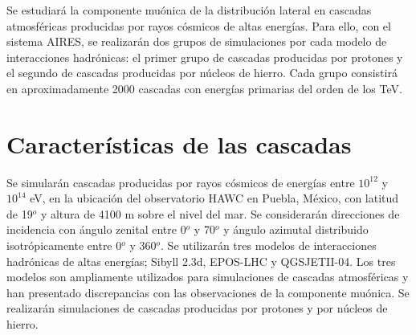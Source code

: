 
Se estudiar\'a la componente mu\'onica de la distribuci\'on lateral en cascadas atmosf\'ericas producidas por rayos c\'osmicos de altas energ\'ias. Para ello, con el sistema AIRES, se realizar\'an dos grupos de simulaciones por cada modelo de interacciones hadr\'onicas: el primer grupo de cascadas producidas por protones y el segundo de cascadas producidas por n\'ucleos de hierro. Cada grupo consistir\'a en aproximadamente 2000 cascadas con energ\'ias primarias del orden de los TeV.

\section{Características de las cascadas}
Se simular\'an cascadas producidas por rayos cósmicos de energías entre $10^{12}$ y $10^{14}$ eV, en la ubicaci\'on del observatorio HAWC en Puebla, M\'exico, con latitud de 19$^{o}$ y altura de 4100 m sobre el nivel del mar. Se considerar\'an direcciones de incidencia con ángulo zenital  entre 0$^{o}$ y 70$^{o}$ y ángulo azimutal distribuido isotrópicamente entre 0$^{o}$ y 360$^{o}$. Se utilizar\'an tres modelos de interacciones hadrónicas de altas energías; Sibyll 2.3d, EPOS-LHC y QGSJETII-04. Los tres modelos son ampliamente utilizados para simulaciones de cascadas atmosf\'ericas y han presentado discrepancias con las observaciones de la componente mu\'onica. Se realizar\'an simulaciones de cascadas producidas por protones y por n\'ucleos de hierro. \\
	 

